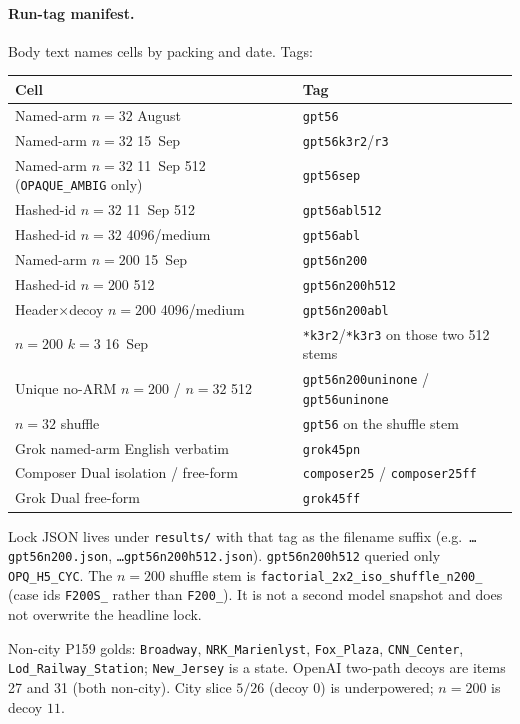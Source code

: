 \documentclass[10pt]{article} %
\begin{document}
\paragraph{Run-tag manifest.}
Body text names cells by packing and date. Tags:

{\small
\setlength{\tabcolsep}{4pt}
\begin{tabular}{@{}ll@{}}
\toprule
Cell & Tag \\
\midrule
Named-arm $n{=}32$ August & \texttt{gpt56} \\
Named-arm $n{=}32$ 15~Sep & \texttt{gpt56k3r2}/\texttt{r3} \\
Named-arm $n{=}32$ 11~Sep 512 (\texttt{OPAQUE\_AMBIG} only) & \texttt{gpt56sep} \\
Hashed-id $n{=}32$ 11~Sep 512 & \texttt{gpt56abl512} \\
Hashed-id $n{=}32$ 4096/medium & \texttt{gpt56abl} \\
Named-arm $n{=}200$ 15~Sep & \texttt{gpt56n200} \\
Hashed-id $n{=}200$ 512 & \texttt{gpt56n200h512} \\
Header$\times$decoy $n{=}200$ 4096/medium & \texttt{gpt56n200abl} \\
$n{=}200$ $k{=}3$ 16~Sep & \texttt{*k3r2}/\texttt{*k3r3} on those two 512 stems \\
Unique no-ARM $n{=}200$ / $n{=}32$ 512 & \texttt{gpt56n200uninone} / \texttt{gpt56uninone} \\
$n{=}32$ shuffle & \texttt{gpt56} on the shuffle stem \\
Grok named-arm English verbatim & \texttt{grok45pn} \\
Composer Dual isolation / free-form & \texttt{composer25} / \texttt{composer25ff} \\
Grok Dual free-form & \texttt{grok45ff} \\
\bottomrule
\end{tabular}
}

Lock JSON lives under \texttt{results/} with that tag as the filename suffix
(e.g.\ \texttt{\ldots gpt56n200.json}, \texttt{\ldots gpt56n200h512.json}).
\texttt{gpt56n200h512} queried only \texttt{OPQ\_H5\_CYC}.
The $n{=}200$ shuffle stem is
\texttt{factorial\_2x2\_iso\_shuffle\_n200\_}
(case ids \texttt{F200S\_} rather than \texttt{F200\_}).
It is not a second model snapshot and does not overwrite the headline lock.

Non-city P159 golds: \texttt{Broadway}, \texttt{NRK\_Marienlyst},
\texttt{Fox\_Plaza}, \texttt{CNN\_Center}, \texttt{Lod\_Railway\_Station};
\texttt{New\_Jersey} is a state.
OpenAI two-path decoys are items 27 and 31 (both non-city).
City slice $5/26$ (decoy $0$) is underpowered; $n{=}200$ is decoy $11$.
\end{document}
